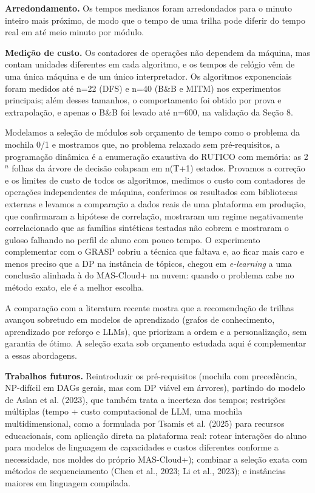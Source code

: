 \documentclass[12pt,a4paper]{article}
\newcommand{\secao}[1]{\par\vspace{1.2em}\noindent{\bfseries #1}\par\vspace{0.8em}\nopagebreak}
\begin{document}
\textbf{Arredondamento.} Os tempos medianos foram arredondados para o minuto inteiro mais próximo, de modo que o tempo de uma trilha pode diferir do tempo real em até meio minuto por módulo.

\textbf{Medição de custo.} Os contadores de operações não dependem da máquina, mas contam unidades diferentes em cada algoritmo, e os tempos de relógio vêm de uma única máquina e de um único interpretador. Os algoritmos exponenciais foram medidos até n=22 (DFS) e n=40 (B\&B e MITM) nos experimentos principais; além desses tamanhos, o comportamento foi obtido por prova e extrapolação, e apenas o B\&B foi levado até n=600, na validação da Seção 8.

\secao{11 CONCLUSÃO}
Modelamos a seleção de módulos sob orçamento de tempo como o problema da mochila 0/1 e mostramos que, no problema relaxado sem pré-requisitos, a programação dinâmica é a enumeração exaustiva do RUTICO com memória: as 2\ensuremath{^{n}} folhas da árvore de decisão colapsam em n(T+1) estados. Provamos a correção e os limites de custo de todos os algoritmos, medimos o custo com contadores de operações independentes de máquina, conferimos os resultados com bibliotecas externas e levamos a comparação a dados reais de uma plataforma em produção, que confirmaram a hipótese de correlação, mostraram um regime negativamente correlacionado que as famílias sintéticas testadas não cobrem e mostraram o guloso falhando no perfil de aluno com pouco tempo. O experimento complementar com o GRASP cobriu a técnica que faltava e, ao ficar mais caro e menos preciso que a DP na instância de tópicos, chegou em \textit{e-learning} a uma conclusão alinhada à do MAS-Cloud+ na nuvem: quando o problema cabe no método exato, ele é a melhor escolha.

A comparação com a literatura recente mostra que a recomendação de trilhas avançou sobretudo em modelos de aprendizado (grafos de conhecimento, aprendizado por reforço e LLMs), que priorizam a ordem e a personalização, sem garantia de ótimo. A seleção exata sob orçamento estudada aqui é complementar a essas abordagens.

\textbf{Trabalhos futuros.} Reintroduzir os pré-requisitos (mochila com precedência, NP-difícil em DAGs gerais, mas com DP viável em árvores), partindo do modelo de Aslan et al. (2023), que também trata a incerteza dos tempos; restrições múltiplas (tempo + custo computacional de LLM, uma mochila multidimensional, como a formulada por Tsamis et al. (2025) para recursos educacionais, com aplicação direta na plataforma real: rotear interações do aluno para modelos de linguagem de capacidades e custos diferentes conforme a necessidade, nos moldes do próprio MAS-Cloud+); combinar a seleção exata com métodos de sequenciamento (Chen et al., 2023; Li et al., 2023); e instâncias maiores em linguagem compilada.
\end{document}
